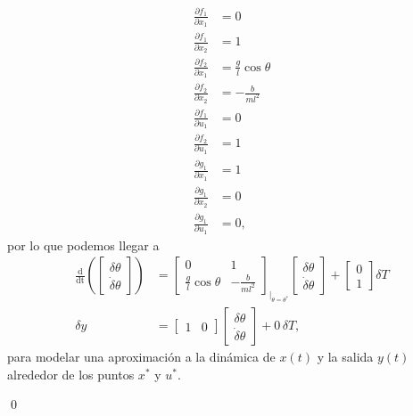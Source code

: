 \begin{example}
\begin{align}
\frac{\partial f_1}{\partial x_1} &= 0 \nonumber \\
\frac{\partial f_1}{\partial x_2} &= 1 \nonumber \\
\frac{\partial f_2}{\partial x_1} &= \frac{g}{l}\cos\theta \nonumber \\
\frac{\partial f_2}{\partial x_2} &= -\frac{b}{ml^2} \nonumber \\
\frac{\partial f_1}{\partial u_1} &= 0 \nonumber \\
\frac{\partial f_2}{\partial u_1} &= 1 \nonumber \\
\frac{\partial g_1}{\partial x_1} &= 1 \nonumber \\
\frac{\partial g_1}{\partial x_2} &= 0 \nonumber \\
\frac{\partial g_1}{\partial u_1} &= 0, \nonumber
\end{align}
por lo que podemos llegar a
\begin{align}
	\frac{\mathrm{d}}{\mathrm{dt}}\left(\begin{bmatrix}\delta\theta \\ \dot\delta\theta \end{bmatrix}\right) &= \begin{bmatrix}0 & 1 \\ \frac{g}{l}\cos\theta & -\frac{b}{ml^2} \end{bmatrix}_{|_{\theta=\theta^*}} \begin{bmatrix}\delta\theta \\ \dot\delta\theta \end{bmatrix} + \begin{bmatrix}0 \\ 1 \end{bmatrix} \delta T \nonumber \\
		\delta y &= \begin{bmatrix}1 & 0\end{bmatrix}\begin{bmatrix}\delta\theta \\ \dot\delta\theta \end{bmatrix} + 0 \, \delta T,
\end{align}
para modelar una aproximación a la dinámica de $x(t)$ y la salida $y(t)$ alrededor de los puntos $x^*$ y $u^*$.

\qed
\end{example}
